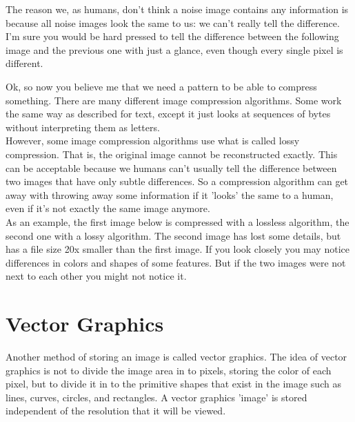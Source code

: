 The reason we, as humans, don't think a noise image contains any information is because all noise images look the same to us: we can't really tell the difference. I'm sure you would be hard pressed to tell the difference between the following image and the previous one with just a glance, even though every single pixel is different.\\

\begin{center}\end{center}

Ok, so now you believe me that we need a pattern to be able to compress something. There are many different image compression algorithms. Some work the same way as described for text, except it just looks at sequences of bytes without interpreting them as letters.\\

However, some image compression algorithms use what is called lossy compression. That is, the original image cannot be reconstructed exactly. This can be acceptable because we humans can't usually tell the difference between two images that have only subtle differences. So a compression algorithm can get away with throwing away some information if it 'looks' the same to a human, even if it's not exactly the same image anymore.\\

As an example, the first image below is compressed with a lossless algorithm, the second one with a lossy algorithm. The second image has lost some details, but has a file size 20x smaller than the first image. If you look closely you may notice differences in colors and shapes of some features. But if the two images were not next to each other you might not notice it.

\begin{center}\end{center}
\begin{center}\end{center}

\section{Vector Graphics}

Another method of storing an image is called vector graphics. The idea of vector graphics is not to divide the image area in to pixels, storing the color of each pixel, but to divide it in to the primitive shapes that exist in the image such as lines, curves, circles, and rectangles. A vector graphics 'image' is stored independent of the resolution that it will be viewed.\\

